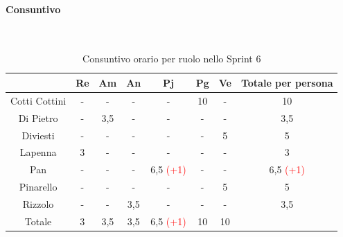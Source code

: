 \documentclass{article}
\begin{document}
                \paragraph{Consuntivo}\mbox{}\\
                \begin{table}[H]
                    \centering
                    \begin{tabular}{|c|c|c|c|c|c|c|c|}
                    \hline
                                    & Re  & Am  & An  & Pj  & Pg  & Ve  & Totale per persona \\ \hline
                    Cotti Cottini & -   & -   & -   & -   & 10  & -   & 10                 \\ \hline
                    Di Pietro     & -   & 3,5 & -   & -   & -   & -   & 3,5                \\ \hline
                    Diviesti      & -   & -   & -   & -   & -   & 5   & 5                  \\ \hline
                    Lapenna       & 3   & -   & -   & -   & -   & -   & 3                  \\ \hline
                    Pan           & -   & -   & -   & 6,5 \textcolor{red}{(+1)} & -   & -   & 6,5 \textcolor{red}{(+1)}               \\ \hline
                    Pinarello     & -   & -   & -   & -   & -   & 5   & 5                  \\ \hline
                    Rizzolo       & -   & -   & 3,5 & -   & -   & -   & 3,5                \\ \hline
                    Totale        & 3   & 3,5 & 3,5 & 6,5 \textcolor{red}{(+1)} & 10  & 10  &                    \\ \hline
                    \end{tabular}
                    \caption{Consuntivo orario per ruolo nello Sprint 6}
                \end{table}

\end{document}
